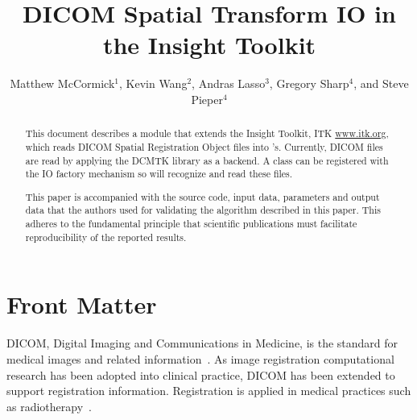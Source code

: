 \documentclass{InsightArticle}
\title{DICOM Spatial Transform IO in the Insight Toolkit}
\author{Matthew McCormick$^{1}$,
        Kevin Wang$^{2}$,
        Andras Lasso$^{3}$,
        Gregory Sharp$^{4}$,
        and Steve Pieper$^{4}$}
\newcommand{\IJhandlerIDnumber}{1338}
\begin{document}
%
%
\IJhandlefooter{\IJhandlerIDnumber}


\ifpdf
\else
\fi


\maketitle


\ifhtml
\chapter*{Front Matter\label{front}}
\fi


\begin{abstract}
\noindent
This document describes a module that extends the Insight Toolkit,
ITK \url{www.itk.org}, which reads DICOM Spatial Registration Object files into
's. Currently, DICOM files are read by applying the DCMTK
library as a backend. A  class can be registered
with the IO factory mechanism so  will recognize
and read these files.

This paper is accompanied with the source code, input data, parameters and
output data that the authors used for validating the algorithm described in
this paper. This adheres to the fundamental principle that scientific
publications must facilitate reproducibility of the reported results.

\end{abstract}

\IJhandlenote{\IJhandlerIDnumber}

\tableofcontents

DICOM, Digital Imaging and Communications in Medicine, is the standard for
medical images and related information~\cite{DICOMStandard}. As image registration
computational research has been adopted into clinical practice,
DICOM has been extended to support registration information. Registration
is applied in medical practices such as radiotherapy~\cite{Pinter2012b}.
\end{document}
